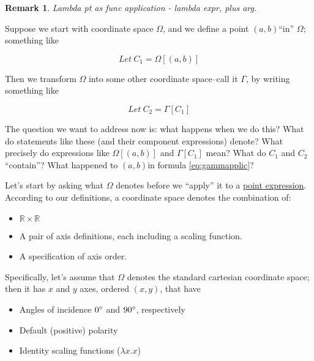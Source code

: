 \documentclass[12pt]{tufte-handout}
\numberwithin{equation}{subsection}
\numberwithin{equation}{subsection}
\newtheorem{remark}{Remark}
\newcommand\cspace{coordinate space}
\newcommand\Omg{\(\Omega\)}
\newcommand\sccs{standard cartesian coordinate space}
\newcommand\ab{\((a,b)\)}
\newcommand\xy{\((x,y)\)}
\begin{document}
  \begin{remark}
    Lambda pt as func application - lambda expr, plus arg.
  \end{remark}

  Suppose we start with \cspace{} \Omg{}, and we define a point \ab ``in''
  \Omg{}; something like

  \begin{equation}
    \label{eq:omgapplic}
    Let\ C_1 = \Omega[(a,b)]
  \end{equation}

  Then we transform \Omg{} into some other \cspace{}--call it \(\Gamma\),
  by writing something like

  \begin{equation}
    \label{eq:gammapplic}
    Let\ C_2 = \Gamma[C_1]
  \end{equation}

  The question we want to address now is: what happens when we do this?
  What do statements like these (and their component expressions)
  denote?  What precisely do expressions like \(\Omega[(a,b)]\) and
  \(\Gamma[C_1]\) mean? What do \(C_1\) and \(C_2\) ``contain''?  What
  happened to \ab in formula \ref{eq:gammapplic}?

  Let's start by asking what \Omg{} denotes before we ``apply'' it to a
  \hyperref[subs:pointexprs]{point expression}.  According to our definitions, a \cspace{} denotes
  the combination of:

  \begin{itemize}
  \item \(\mathds{R}\times\mathds{R}\)
  \item A pair of axis definitions, each including a scaling function.
  \item A specification of axis order.
  \end{itemize}

  Specifically, let's assume that \Omg{} denotes the \sccs{}; then it
  has \(x\) and \(y\) axes, ordered \xy{}, that have

  \begin{itemize}
  \item Angles of incidence \(0\degree\) and \(90\degree\), respectively
  \item Default (positive) polarity
  \item Identity scaling functions (\(\lambda x.x\))
  \end{itemize}
\end{document}

